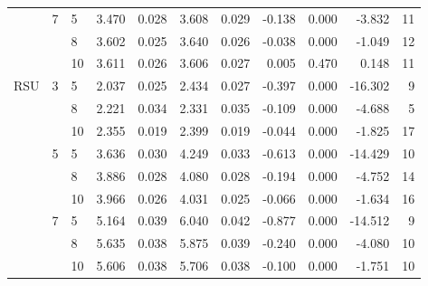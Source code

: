 \begin{tabular}{lllrrrrrrrr}
    & 7 & 5  &    3.470 &     0.028 &  3.608 &     0.029 &     -0.138 &   0.000 &    -3.832 &  11 \\
    &   & 8  &    3.602 &     0.025 &  3.640 &     0.026 &     -0.038 &   0.000 &    -1.049 &  12 \\
    &   & 10 &    3.611 &     0.026 &  3.606 &     0.027 &      0.005 &   0.470 &     0.148 &  11 \\
RSU & 3 & 5  &    2.037 &     0.025 &  2.434 &     0.027 &     -0.397 &   0.000 &   -16.302 &   9 \\
    &   & 8  &    2.221 &     0.034 &  2.331 &     0.035 &     -0.109 &   0.000 &    -4.688 &   5 \\
    &   & 10 &    2.355 &     0.019 &  2.399 &     0.019 &     -0.044 &   0.000 &    -1.825 &  17 \\
    & 5 & 5  &    3.636 &     0.030 &  4.249 &     0.033 &     -0.613 &   0.000 &   -14.429 &  10 \\
    &   & 8  &    3.886 &     0.028 &  4.080 &     0.028 &     -0.194 &   0.000 &    -4.752 &  14 \\
    &   & 10 &    3.966 &     0.026 &  4.031 &     0.025 &     -0.066 &   0.000 &    -1.634 &  16 \\
    & 7 & 5  &    5.164 &     0.039 &  6.040 &     0.042 &     -0.877 &   0.000 &   -14.512 &   9 \\
    &   & 8  &    5.635 &     0.038 &  5.875 &     0.039 &     -0.240 &   0.000 &    -4.080 &  10 \\
    &   & 10 &    5.606 &     0.038 &  5.706 &     0.038 &     -0.100 &   0.000 &    -1.751 &  10 \\
\bottomrule
\end{tabular}
